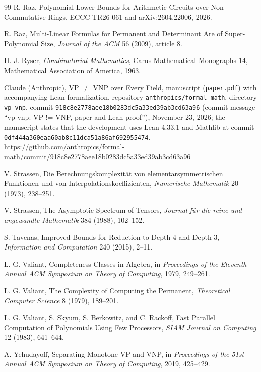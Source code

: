 \documentclass[11pt,letterpaper]{report}
\theoremstyle{plain}
\theoremstyle{definition}
\theoremstyle{remark}
\begin{document}
\begin{thebibliography}{99}
 R. Raz, Polynomial Lower Bounds for Arithmetic Circuits over Non-Commutative Rings, ECCC TR26-061 and arXiv:2604.22006, 2026.

 R. Raz, Multi-Linear Formulas for Permanent and Determinant Are of Super-Polynomial Size, \emph{Journal of the ACM} 56 (2009), article 8.

 H. J. Ryser, \emph{Combinatorial Mathematics}, Carus Mathematical Monographs 14, Mathematical Association of America, 1963.

 Claude (Anthropic), VP $\neq$ VNP over Every Field, manuscript (\texttt{paper.pdf}) with accompanying Lean formalization, repository \texttt{anthropics/formal-math}, directory \texttt{vp-vnp}, commit \texttt{918c8e2778aee18b0283dc5a33ed39ab3cd63a96} (commit message ``vp-vnp: VP != VNP, paper and Lean proof''), November 23, 2026; the manuscript states that the development uses Lean 4.33.1 and Mathlib at commit \texttt{0df444a360eaa60ab8c1\allowbreak1dca51a86af692955474}. \url{https://github.com/anthropics/formal-math/commit/918c8e2778aee18b0283dc5a33ed39ab3cd63a96}

 V. Strassen, Die Berechnungskomplexit\"at von elementarsymmetrischen Funktionen und von Interpolationskoeffizienten, \emph{Numerische Mathematik} 20 (1973), 238--251.

 V. Strassen, The Asymptotic Spectrum of Tensors, \emph{Journal f\"ur die reine und angewandte Mathematik} 384 (1988), 102--152.

 S. Tavenas, Improved Bounds for Reduction to Depth 4 and Depth 3, \emph{Information and Computation} 240 (2015), 2--11.

 L. G. Valiant, Completeness Classes in Algebra, in \emph{Proceedings of the Eleventh Annual ACM Symposium on Theory of Computing}, 1979, 249--261.

 L. G. Valiant, The Complexity of Computing the Permanent, \emph{Theoretical Computer Science} 8 (1979), 189--201.

 L. G. Valiant, S. Skyum, S. Berkowitz, and C. Rackoff, Fast Parallel Computation of Polynomials Using Few Processors, \emph{SIAM Journal on Computing} 12 (1983), 641--644.

 A. Yehudayoff, Separating Monotone VP and VNP, in \emph{Proceedings of the 51st Annual ACM Symposium on Theory of Computing}, 2019, 425--429.

\end{thebibliography}
\end{document}
